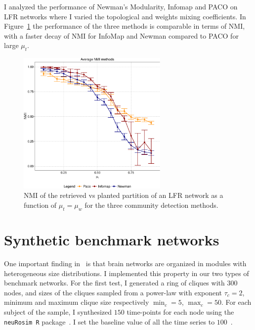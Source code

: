 I analyzed the performance of Newman's Modularity, Infomap and PACO on LFR networks where I varied the topological and weights mixing coefficients.
In Figure~\ref{fig:avgmutmuw} the performance of the three methods is comparable in terms of NMI, with a faster decay of NMI for InfoMap and Newman compared to PACO for large $\mu_t$.

\begin{figure}[!htb]
\centering
\includegraphics[width=0.65\textwidth]{images/avg_nmi_allmethods_lfr_errorbars.pdf}
\caption{NMI of the retrieved vs planted partition of an LFR network as a function of $\mu_t=\mu_w$ for the three community detection methods.}
\label{fig:avgmutmuw}
\end{figure}

\section{Synthetic benchmark networks}
One important finding in~\cite{nicolini2016} is that brain networks are organized in modules with heterogeneous size distributions.
I implemented this property in our two types of benchmark networks.
For the first test, I generated a ring of cliques with $300$ nodes, and sizes of the cliques sampled from a power-law with exponent $\tau_c=2$, minimum and maximum clique size respectively $\min_c=5$, $\max_c=50$.
For each subject of the sample, I synthesized $150$ time-points for each node using the \texttt{neuRosim R} package~\cite{neurosim2011}.
I set the baseline value of all the time series to $100$~\cite{welvaert2013}.

